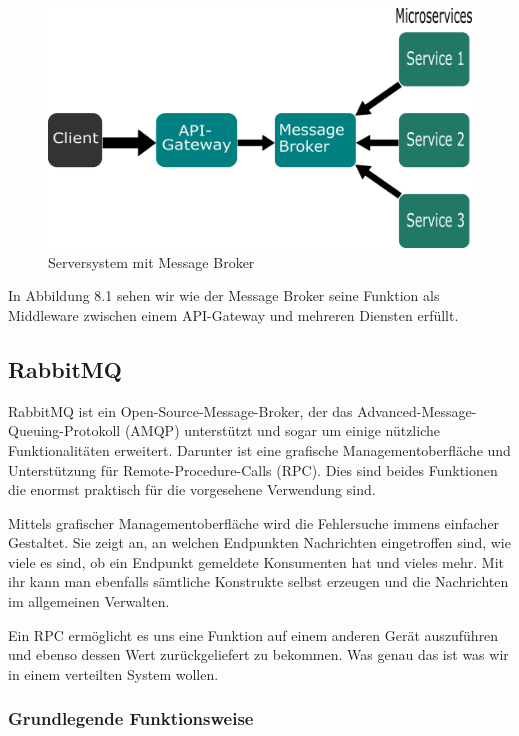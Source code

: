 \documentclass[12pt,a4paper]{scrartcl}
\begin{document}
\begin{figure}[h!]
	\centering
	\includegraphics[scale=1.8]{MesBroSys.png}
	\caption[Selbst erstellte Grafik]{Serversystem mit Message Broker}
\end{figure}

In Abbildung 8.1 sehen wir wie der Message Broker seine Funktion als Middleware zwischen einem API-Gateway und mehreren Diensten erfüllt.  

\subsection{RabbitMQ}
RabbitMQ ist ein Open-Source-Message-Broker, der das Advanced-Message-Queuing-Protokoll (AMQP) unterstützt und sogar um einige nützliche Funktionalitäten erweitert\cite{rabExt}.
Darunter ist eine grafische Managementoberfläche und Unterstützung für Remote-Procedure-Calls (RPC). Dies sind beides Funktionen die enormst praktisch für die vorgesehene Verwendung sind.

Mittels grafischer Managementoberfläche wird die Fehlersuche immens einfacher Gestaltet. Sie zeigt an, an welchen Endpunkten Nachrichten eingetroffen sind, wie viele es sind, ob ein Endpunkt gemeldete Konsumenten hat und vieles mehr. Mit ihr kann man ebenfalls sämtliche Konstrukte selbst erzeugen und die Nachrichten im allgemeinen Verwalten. 

Ein RPC ermöglicht es uns eine Funktion auf einem anderen Gerät auszuführen und ebenso dessen Wert zurückgeliefert zu bekommen. Was genau das ist was wir in einem verteilten System wollen.

\subsubsection{Grundlegende Funktionsweise}
\end{document}
